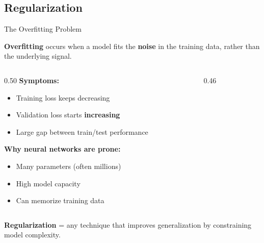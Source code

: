 \documentclass[aspectratio=169]{beamer}
\begin{document}
\subsection{Regularization}
%
\begin{frame}{The Overfitting Problem}

\textbf{Overfitting} occurs when a model fits the \textbf{noise} in the training data, rather than the underlying signal.

\begin{columns}
\begin{column}{0.50\textwidth}
\textbf{Symptoms:}
\begin{itemize}
    \item Training loss keeps decreasing
    \item Validation loss starts \textbf{increasing}
    \item Large gap between train/test performance
\end{itemize}

\medskip
\textbf{Why neural networks are prone:}
\begin{itemize}
    \item Many parameters (often millions)
    \item High model capacity
    \item Can memorize training data
\end{itemize}
\end{column}
\begin{column}{0.46\textwidth}
\begin{center}
\end{center}
\end{column}
\end{columns}

\vspace{0.3cm}
\textbf{Regularization} = any technique that improves generalization by constraining model complexity.
\end{frame}
\end{document}
